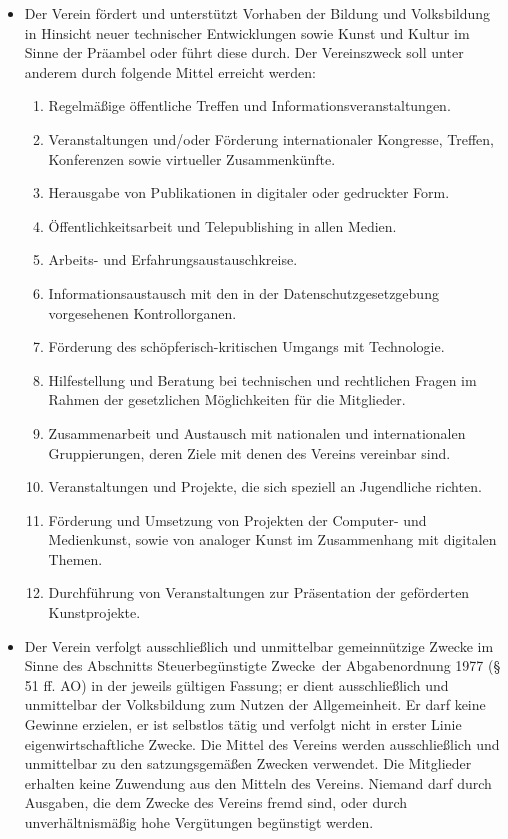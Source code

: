 \documentclass[12pt,paper=a4,ngerman]{scrreprt}
\begin{document}
\begin{itemize}
\item[(1)]
Der Verein fördert und unterstützt Vorhaben der Bildung und
Volksbildung in Hinsicht neuer technischer Entwicklungen sowie Kunst
und Kultur im Sinne der Präambel oder führt diese durch. Der
Vereinszweck soll unter anderem durch folgende Mittel erreicht
werden:
\begin{enumerate}
\item
Regelmäßige öffentliche Treffen und Informationsveranstaltungen.
\item
Veranstaltungen und/oder Förderung internationaler Kongresse, Treffen,
Konferenzen sowie virtueller Zusammenkünfte.
\item
Herausgabe von Publikationen in digitaler oder gedruckter Form.
\item
Öffentlichkeitsarbeit und Telepublishing in allen Medien.
\item
Arbeits- und Erfahrungsaustauschkreise.
\item
Informationsaustausch mit den in der Datenschutzgesetzgebung
vorgesehenen Kontrollorganen.
\item
Förderung des schöpferisch-kritischen Umgangs mit Technologie.
\item
Hilfestellung und Beratung bei technischen und rechtlichen Fragen im
Rahmen der gesetzlichen Möglichkeiten für die Mitglieder.
\item
Zusammenarbeit und Austausch mit nationalen und internationalen
Gruppierungen, deren Ziele mit denen des Vereins vereinbar sind.
\item
Veranstaltungen und Projekte, die sich speziell an Jugendliche richten.
\item
Förderung und Umsetzung von Projekten der Computer- und
Medienkunst, sowie von analoger Kunst im Zusammenhang mit
digitalen Themen.
\item
Durchführung von Veranstaltungen zur Präsentation der geförderten Kunstprojekte.
\end{enumerate}
\item[(2)]
Der Verein verfolgt ausschließlich und unmittelbar gemeinnützige
Zwecke im Sinne des Abschnitts \glqq Steuerbegünstigte Zwecke\grqq\
der Abgabenordnung 1977 (§ 51 ff. AO) in der jeweils gültigen
Fassung; er dient ausschließlich und unmittelbar der Volksbildung zum
Nutzen der Allgemeinheit. Er darf keine Gewinne erzielen, er ist
selbstlos tätig und verfolgt nicht in erster Linie
eigenwirtschaftliche Zwecke. Die Mittel des Vereins werden
ausschließlich und unmittelbar zu den satzungsgemäßen Zwecken
verwendet. Die Mitglieder erhalten keine Zuwendung aus den Mitteln des
Vereins. Niemand darf durch Ausgaben, die dem Zwecke des Vereins fremd sind,
oder durch unverhältnismäßig hohe Vergütungen begünstigt werden.
\end{itemize}
\end{document}

